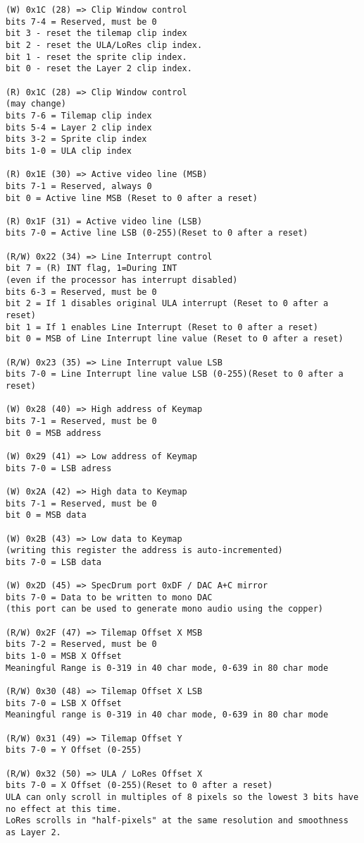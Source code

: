 \begin{verbatim}
(W) 0x1C (28) => Clip Window control
bits 7-4 = Reserved, must be 0
bit 3 - reset the tilemap clip index
bit 2 - reset the ULA/LoRes clip index.
bit 1 - reset the sprite clip index.
bit 0 - reset the Layer 2 clip index.

(R) 0x1C (28) => Clip Window control
(may change)
bits 7-6 = Tilemap clip index
bits 5-4 = Layer 2 clip index
bits 3-2 = Sprite clip index
bits 1-0 = ULA clip index

(R) 0x1E (30) => Active video line (MSB)
bits 7-1 = Reserved, always 0
bit 0 = Active line MSB (Reset to 0 after a reset)

(R) 0x1F (31) = Active video line (LSB)
bits 7-0 = Active line LSB (0-255)(Reset to 0 after a reset)

(R/W) 0x22 (34) => Line Interrupt control
bit 7 = (R) INT flag, 1=During INT
(even if the processor has interrupt disabled)
bits 6-3 = Reserved, must be 0
bit 2 = If 1 disables original ULA interrupt (Reset to 0 after a reset)
bit 1 = If 1 enables Line Interrupt (Reset to 0 after a reset)
bit 0 = MSB of Line Interrupt line value (Reset to 0 after a reset)

(R/W) 0x23 (35) => Line Interrupt value LSB
bits 7-0 = Line Interrupt line value LSB (0-255)(Reset to 0 after a reset)

(W) 0x28 (40) => High address of Keymap
bits 7-1 = Reserved, must be 0
bit 0 = MSB address

(W) 0x29 (41) => Low address of Keymap
bits 7-0 = LSB adress

(W) 0x2A (42) => High data to Keymap
bits 7-1 = Reserved, must be 0
bit 0 = MSB data

(W) 0x2B (43) => Low data to Keymap
(writing this register the address is auto-incremented)
bits 7-0 = LSB data

(W) 0x2D (45) => SpecDrum port 0xDF / DAC A+C mirror
bits 7-0 = Data to be written to mono DAC
(this port can be used to generate mono audio using the copper)

(R/W) 0x2F (47) => Tilemap Offset X MSB
bits 7-2 = Reserved, must be 0
bits 1-0 = MSB X Offset
Meaningful Range is 0-319 in 40 char mode, 0-639 in 80 char mode

(R/W) 0x30 (48) => Tilemap Offset X LSB
bits 7-0 = LSB X Offset
Meaningful range is 0-319 in 40 char mode, 0-639 in 80 char mode

(R/W) 0x31 (49) => Tilemap Offset Y
bits 7-0 = Y Offset (0-255)

(R/W) 0x32 (50) => ULA / LoRes Offset X
bits 7-0 = X Offset (0-255)(Reset to 0 after a reset)
ULA can only scroll in multiples of 8 pixels so the lowest 3 bits have no effect at this time.
LoRes scrolls in "half-pixels" at the same resolution and smoothness as Layer 2.


\end{verbatim}
